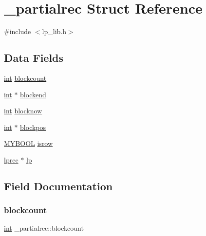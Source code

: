\hypertarget{struct__partialrec}{}\section{\+\_\+partialrec Struct Reference}
\label{struct__partialrec}


{\ttfamily \#include $<$lp\+\_\+lib.\+h$>$}

\subsection*{Data Fields}
\begin{DoxyCompactItemize}
\item 
\hyperlink{lp__lib_8h_adeb9ec6400320e4923ac9d836d509ddb}{int} \hyperlink{struct__partialrec_a37291d5dba5c4bd78df1d40348f9a923}{blockcount}
\item 
\hyperlink{lp__lib_8h_adeb9ec6400320e4923ac9d836d509ddb}{int} $\ast$ \hyperlink{struct__partialrec_a5d31d7b3d9c7a45cc8f94d14e29c4f71}{blockend}
\item 
\hyperlink{lp__lib_8h_adeb9ec6400320e4923ac9d836d509ddb}{int} \hyperlink{struct__partialrec_a86036583c8bd9eb6cd80f556dc37166d}{blocknow}
\item 
\hyperlink{lp__lib_8h_adeb9ec6400320e4923ac9d836d509ddb}{int} $\ast$ \hyperlink{struct__partialrec_aca2d6dbb47b627f7443527e14b892738}{blockpos}
\item 
\hyperlink{lp__lib_8h_aad848328fb3018217ac9f01d97b6bd88}{M\+Y\+B\+O\+OL} \hyperlink{struct__partialrec_ad2827e1e45aeea2e5b4f7d8bb9860330}{isrow}
\item 
\hyperlink{lp__types_8h_afe42f1373b9ee8d824b5cad6a22d24c6}{lprec} $\ast$ \hyperlink{struct__partialrec_a92450508cfcd6f3542d551084f00165f}{lp}
\end{DoxyCompactItemize}


\subsection{Field Documentation}
\mbox{\label{struct__partialrec_a37291d5dba5c4bd78df1d40348f9a923}} 
\subsubsection{\texorpdfstring{blockcount}{blockcount}}
{\footnotesize\ttfamily \hyperlink{lp__lib_8h_adeb9ec6400320e4923ac9d836d509ddb}{int} \+\_\+partialrec\+::blockcount}

